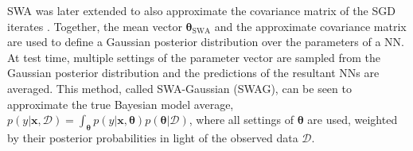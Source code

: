 \documentclass[a4paper,11pt]{article}
\newcommand{\matr}[1]{\mathbf{#1}}
\newcommand{\bgreek}[1]{\boldsymbol{#1}}
\begin{document}
%
%
%

SWA was later extended to also approximate the covariance matrix of the SGD iterates \cite{maddox2019}. Together, the mean vector $\bgreek{\theta}_{\text{SWA}}$ and the approximate covariance matrix are used to define a Gaussian posterior distribution over the parameters of a NN. At test time, multiple settings of the parameter vector are sampled from the Gaussian posterior distribution and the predictions of the resultant NNs are averaged. This method, called SWA-Gaussian (SWAG), can be seen to approximate the true Bayesian model average, $p(y | \matr{x}, \mathcal{D}) = \int_{\bgreek{\theta}} p(y | \matr{x}, \bgreek{\theta}) p(\bgreek{\theta} | \mathcal{D})$, where all settings of $\bgreek{\theta}$ are used, weighted by their posterior probabilities in light of the observed data $\mathcal{D}$. 
\end{document}
